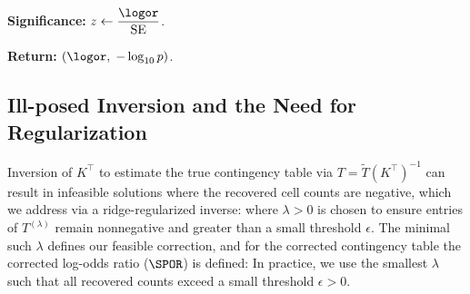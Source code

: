 \documentclass[lineno]{biometrika}
\begin{document}
\begin{algorithm}[t]
\BlankLine
\textbf{Significance:}\;
$z \leftarrow \dfrac{\logor}{\text{SE}}$.\;

\BlankLine
\textbf{Return:}\;
\Return $(\logor,\;-\log_{10}p)$.\;

\end{algorithm}

\subsection{Ill-posed Inversion and the Need for Regularization}
Inversion of $K^\top$ to estimate the true contingency table via $T = \tilde{T} (K^\top)^{-1}$ can result in infeasible solutions where the recovered cell counts are negative, which we address via  a ridge-regularized inverse:
where $\lambda > 0$ is chosen to ensure entries of $T^{(\lambda)}$ remain nonnegative and greater than a small threshold $\epsilon$. The minimal such $\lambda$ defines our feasible correction, and for the corrected contingency table
the corrected log-odds ratio ($\SPOR$) is defined:
In practice, we use the smallest $\lambda$ such that all recovered counts exceed a small threshold $\epsilon > 0$.
\end{document}

